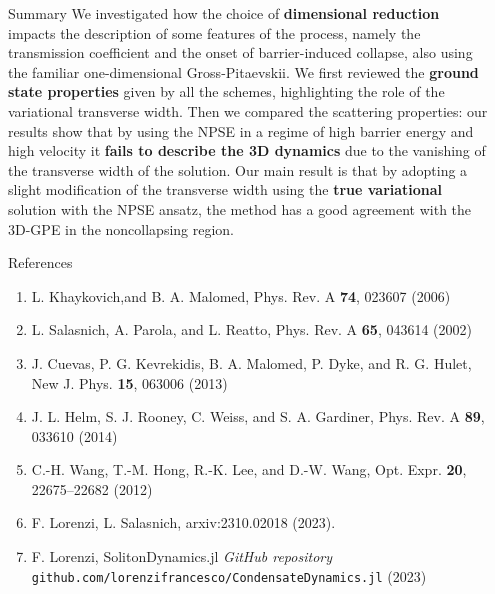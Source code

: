 \documentclass[final]{beamer}
\newlength{\sepwidth}
\newlength{\colwidth}
\newcommand{\separatorcolumn}{\begin{column}{\sepwidth}\end{column}}
\begin{document}
\begin{frame}[t]
\begin{columns}[t]
\begin{column}{\colwidth}
      \begin{block}{Summary}
        We investigated how the choice of \textbf{dimensional reduction} impacts the description of some features of the process, namely the transmission coefficient and the onset of barrier-induced collapse, also using the familiar one-dimensional Gross-Pitaevskii. We first reviewed the \textbf{ground state properties} given by all the schemes, highlighting the role of the variational transverse width. Then we compared the scattering properties: our results show that by using the NPSE in a regime of high barrier energy and high velocity it \textbf{fails to describe the 3D dynamics} due to the vanishing of the transverse width of the solution. Our main result is that by adopting a slight modification of the transverse width using the \textbf{true variational} solution with the NPSE ansatz, the method has a good agreement with the 3D-GPE in the noncollapsing region.
      \end{block}
      \begin{block}{References}
        \printbibliography[heading=none]          
        \begin{enumerate}
            \item L. Khaykovich,and B. A. Malomed, Phys. Rev. A \textbf{74}, 023607 (2006)
            \item L. Salasnich, A. Parola, and L. Reatto, Phys. Rev. A \textbf{65}, 043614 (2002)
            \item J. Cuevas, P. G. Kevrekidis, B. A. Malomed, P. Dyke, and R. G. Hulet, New J. Phys. \textbf{15}, 063006 (2013)
            \item J. L. Helm, S. J. Rooney, C. Weiss, and S. A. Gardiner, Phys. Rev. A \textbf{89}, 033610 (2014)
            \item C.-H. Wang, T.-M. Hong, R.-K. Lee, and D.-W. Wang, Opt. Expr. \textbf{20}, 22675–22682 (2012)
            \item F. Lorenzi, L. Salasnich, arxiv:2310.02018 (2023).
            \item F. Lorenzi, SolitonDynamics.jl \textit{GitHub repository} \texttt{github.com/lorenzifrancesco/CondensateDynamics.jl} (2023)
        \end{enumerate}
      \end{block}

    \end{column}
    \separatorcolumn
  \end{columns}
\end{frame}
\end{document}
